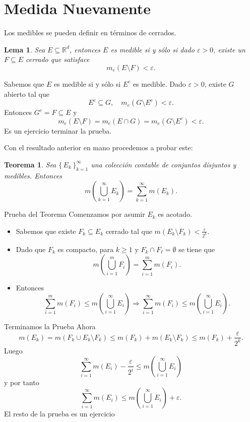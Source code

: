 \documentclass[utf8]{beamer}
\theoremstyle{plain}
\newtheorem{Th}{Teorema}               %
\newtheorem{Lem}{Lema}                 %
\theoremstyle{definition}
\theoremstyle{remark}
\numberwithin{equation}{section}
\newcommand{\eps}{\varepsilon}          %
\newcommand{\bR}{\mathbb{R}}    %
\newcommand{\set}[1]{\{\,#1\,\}}    %
\renewcommand{\geq}{\geqslant}          %
\renewcommand{\l}{\ell}                   %
\renewcommand{\leq}{\leqslant}          %
\newcommand{\less}{\setminus}           %
\newcommand{\To}{\Rightarrow}
\newcommand{\suci}{_{i=1}^\infty} %
\newcommand{\suck}{_{k=1}^\infty} %
\renewcommand{\.}{\Cdot}                %
\begin{document}
\section{Medida Nuevamente}

\begin{frame}
  Los medibles se pueden definir en términos de cerrados.
  \begin{Lem}\label{lem:equivMedible}
    Sea $E\subseteq\bR^d$, entonces $E$ es medible si y sólo si dado $\eps>0$, existe un $F\subseteq E$ cerrado que satisface 
    $$m_e(E\less F)<\eps.$$
  \end{Lem}
  Sabemos que $E$ es medible si y sólo si $E^c$ es medible. Dado $\eps>0$, existe $G$ abierto tal que 
  $$E^c\subseteq G,\quad m_e(G\less E^c)<\eps.$$
  Entonces $G^c=F\subseteq E$ y 
  $$m_e(E\less F)=m_e(E\cap G)=m_e(G\less E^c)<\eps.$$
  Es un \alert{ejercicio} terminar la prueba.
\end{frame}

\begin{frame}
  Con el resultado anterior en mano procedemos a probar este:
  \begin{Th}\label{th:sumaMedidaDisjuntos}
    Sea $\set{E_k}\suck$ una colección contable de conjuntos disjuntos y medibles. Entonces 
    $$m\left(\bigcup\suck E_k\right)=\sum\suck m(E_k).$$
  \end{Th}
\end{frame}

\begin{frame}{Prueba del Teorema}
  Comenzamos por asumir $E_k$ es acotado.
  \begin{itemize}
    \item Sabemos que existe $F_k\subseteq E_k$ cerrado tal que $m(E_k\less F_k)<\frac{\eps}{2^k}$.
    \item Dado que $F_k$ es compacto, para $k\geq 1$ y $F_k\cap F_\l=\emptyset$ se tiene que 
    $$m\left(\bigcup_{i=1}^m F_i\right)=\sum_{i=1}^m m(F_i).$$
    \item Entonces 
    $$\sum_{i=1}^m m(F_i)\leq m\left(\bigcup\suci E_i\right)\To\sum\suci m(F_i)\leq m\left(\bigcup\suci E_i\right).$$
  \end{itemize}
\end{frame}

\begin{frame}{Terminamos la Prueba}
  Ahora 
  $$m(E_k)=m(F_k\cup E_k\less F_k)\leq m(F_k)+m(E_k\less F_k)\leq m(F_k)+\frac{\eps}{2^k}.$$
  Luego 
  $$\sum\suci m(E_i)-\frac{\eps}{2^i}\leq m\left(\bigcup\suci E_i\right)$$
  y por tanto 
  $$\sum\suci m(E_i)\leq m\left(\bigcup\suci E_i\right)+\eps.$$
  El resto de la prueba es un \alert{ejercicio}
\end{frame}
\end{document}
